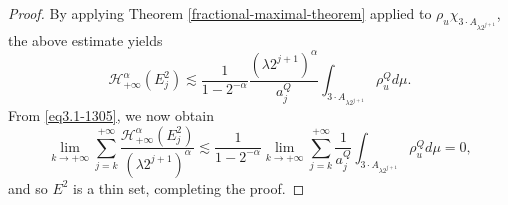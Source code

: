 \documentclass[10pt]{amsart}
\newtheorem{lemma}[theorem]{Lemma}
\numberwithin{equation}{section}
\begin{document}
\begin{proof}
By applying Theorem 
\ref{fractional-maximal-theorem} applied to $\rho_u\chi_{3\cdot A_{\lambda 2^{j+1}}}$, the above estimate yields
	\[
		\mathcal H^{\alpha}_{+\infty}(E_j^2)\lesssim  \frac{1}{1-2^{-\alpha}} \frac{(\lambda 2^{j+1})^\alpha}{a_j^Q}\int_{3\cdot A_{\lambda 2^{j+1}}}\rho_u^Qd\mu.
	\]
From \eqref{eq3.1-1305}, we now obtain  
\[
\lim_{k\to{+\infty}}\sum_{j=k}^{+\infty} 
\frac{\mathcal H^\alpha_{+\infty}(E_j^2)}{(\lambda 2^{j+1})^\alpha}\lesssim  \frac{1}{1-2^{-\alpha}}  \lim_{k\to{+\infty}}\sum_{j=k}^{+\infty} \frac{1}{a_j^Q}\int_{3\cdot A_{\lambda 2^{j+1}}}\rho_u^Qd\mu=0,
\]	
and so $E^2$ is a thin set, completing the proof.
\end{proof} 


 
\end{document}
